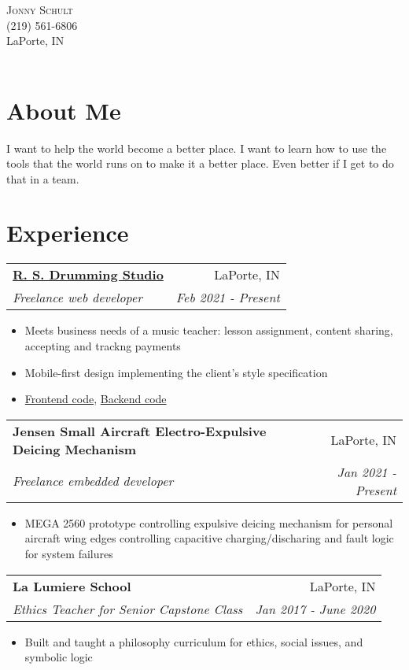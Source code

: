 \documentclass[letterpaper,11pt]{article}
\makeatletter
\newcommand{\resumeItem}[1]{
  \item\small{#1}
}
\newcommand{\resumeHeading}[4]{
    \begin{tabular*}{0.99\textwidth}[t]{l@{\extracolsep{\fill}}r}
      \textbf{#1} & #2 \\
      \textit{\small#3} & \textit{\small #4} \\
    \end{tabular*}\vspace{-5pt}
}
\newcommand{\resumeItemListStart}{\begin{itemize}}
\newcommand{\resumeItemListEnd}{\end{itemize}\vspace{-5pt}}
\makeatother
\begin{document}
\par{
    \centering
		{
            \huge \textsc{Jonny} \textsc{Schult} \\
            \normalsize (219) 561-6806 \\ LaPorte, IN \\
            \Large \color{RoyalBlue}\href{https://github.com/jonnyschult}{}
            \Large \href{mailto:jonathon.schult@gmail.com}{}
            \Large \color{RoyalBlue}\href{http://www.linkedin.com/in/jonny-schult/}{}\\
    } \bigskip \par
}

\section{About Me}
I want to help the world become a better place. I want to learn how to use the tools that the world runs on to make it a better place. Even better if I get to do that in a team.

\section{Experience}
  \resumeHeading{\color{RoyalBlue}\href{https://www.rsdrum.com}{R. S. Drumming Studio}}{LaPorte, IN}{Freelance web developer}{Feb 2021 - Present}
      \resumeItemListStart
        \resumeItem{Meets business needs of a music teacher: lesson assignment, content sharing, accepting and trackng payments}
        \resumeItem{Mobile-first design implementing the client's style specification}
        \resumeItem{\color{RoyalBlue}\href{https://github.com/jonnyschult/rsdrumFrontend}{Frontend code}, \color{RoyalBlue}\href{https://github.com/jonnyschult/rsdrumBackend}{Backend code}}
      \resumeItemListEnd

  \resumeHeading{Jensen Small Aircraft Electro-Expulsive Deicing Mechanism}{LaPorte, IN}{Freelance embedded developer}{Jan 2021 - Present}
      \resumeItemListStart
        \resumeItem{MEGA 2560 prototype controlling expulsive deicing mechanism for personal aircraft wing edges controlling capacitive charging/discharing and fault logic for system failures}
      \resumeItemListEnd

  \resumeHeading{La Lumiere School}{LaPorte, IN}{Ethics Teacher for Senior Capstone Class}{Jan 2017 - June 2020}
      \resumeItemListStart
        \resumeItem{Built and taught a philosophy curriculum for ethics, social issues, and symbolic logic}
      \resumeItemListEnd
\end{document}
